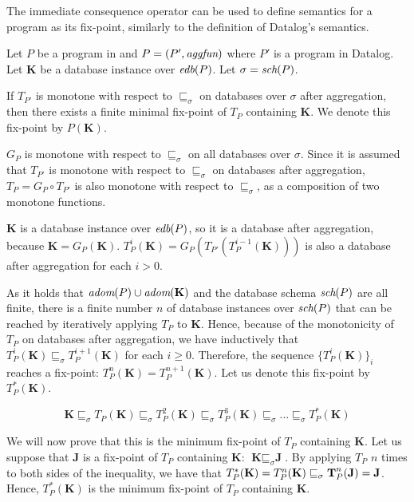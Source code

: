 The immediate consequence operator can be used to define semantics for a \datalogra program as its fix-point, similarly to the definition of Datalog's semantics.

\begin{thm}
Let $P$ be a program in \datalogra and $P = (P', \textit{aggfun})$ where $P'$ is a program in Datalog. Let $\textbf{K}$ be a database instance over $\textit{edb}(P)$. Let $\sigma = \textit{sch}(P)$.

If $T_{P'}$ is monotone with respect to $\sqsubseteq_\sigma$ on databases over $\sigma$ after aggregation, then there exists a finite minimal fix-point of $T_P$ containing $\textbf{K}$. We denote this fix-point by $P(\textbf{K})$.
\end{thm}
\begin{prof}
$G_P$ is monotone with respect to $\sqsubseteq_\sigma$ on all databases over $\sigma$.  Since it is assumed that $T_{P'}$ is monotone with respect to $\sqsubseteq_\sigma$ on databases after aggregation, $T_P = G_P \circ T_{P'}$ is also monotone with respect to $\sqsubseteq_\sigma$, as a composition of two monotone functions. 

$\textbf{K}$ is a database instance over $\textit{edb}(P)$, so it is a database after aggregation, because $\textbf{K} = G_P(\textbf{K})$.  $T_P^i(\textbf{K}) = G_P(T_{P'}(T_P^{i-1}(\textbf{K})))$ is also a database after aggregation for each $i > 0$.

As it holds that $\textit{adom}(P) \cup \textit{adom}(\textbf{K})$ and the database schema $\textit{sch}(P)$ are all finite, there is a finite number $n$ of database instances over $\textit{sch}(P)$ that can be reached by iteratively applying $T_P$ to $\textbf{K}$. Hence, because of the monotonicity of $T_P$ on databases after aggregation, we have inductively that $T_P^i(\textbf{K}) \sqsubseteq_\sigma T_P^{i+1}(\textbf{K})$ for each $i \ge 0$. Therefore, the sequence $\{T_P^i(\textbf{K})\}_i$ reaches a fix-point: $T_P^n(\textbf{K}) = T_P^{n+1}(\textbf{K})$. Let us denote this fix-point by $T_P^*(\textbf{K})$.

$$\textbf{K} \sqsubseteq_\sigma T_P(\textbf{K}) \sqsubseteq_\sigma T_P^2(\textbf{K}) \sqsubseteq_\sigma T_P^3(\textbf{K}) \sqsubseteq_\sigma \dots \sqsubseteq_\sigma T_P^*(\textbf{K}) $$


We will now prove that this is the minimum fix-point of $T_P$ containing $\textbf{K}$. Let us suppose that $\textbf{J}$ is a fix-point of $T_P$ containing  $\textbf{K}$:  $\textbf{K} \sqsubseteq_\sigma \textbf{J}$. By applying $T_P$ $n$ times to both sides of the inequality, we have that $T_P^*(\textbf{K}) = T_P^n(\textbf{K}) \sqsubseteq_\sigma \textbf T_P^n(\textbf{J}) = \textbf{J}$. Hence, $T_P^*(\textbf{K})$ is the minimum fix-point of $T_P$ containing $\textbf{K}$.

\end{prof}


